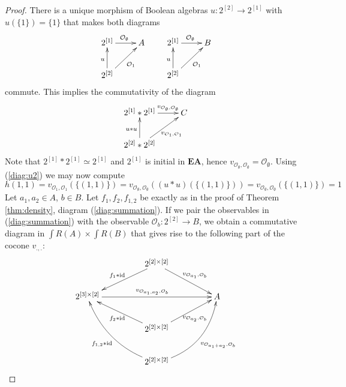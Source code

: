 \documentclass[smallextended]{svjour3}
\begin{document}
\begin{proof}
There is a unique morphism of Boolean algebras 
$u:2^{[2]}\to 2^{[1]}$ with $u(\{1\})=\{1\}$ that makes both diagrams
\begin{equation}
\label{diag:u}
\xymatrix{
2^{[1]}
	\ar[r]^{{\mathcal O_{{\emptyset}}}}
&
A
\\
2^{[2]}
	\ar[u]^u
	\ar[ur]_{{\mathcal O_{{1}}}}
}
\qquad
\xymatrix{
2^{[1]}
	\ar[r]^{{\mathcal O_{{\emptyset}}}}
&
B
\\
2^{[2]}
	\ar[u]^u
	\ar[ur]_{{\mathcal O_{{1}}}}
}
\end{equation}
commute.
This implies the commutativity of the diagram
\begin{equation}
\label{diag:u2}
\xymatrix{
2^{[1]}*2^{[1]}
	\ar[r]^-{v_{{\mathcal O_{{\emptyset}}},{\mathcal O_{{\emptyset}}}}}
&
C
\\
2^{[2]}*2^{[2]}
	\ar[u]^{u*u}
	\ar[ur]_{v_{{\mathcal O_{{1}}},{\mathcal O_{{1}}}}}
}
\end{equation}
Note that $2^{[1]}*2^{[1]}\simeq 2^{[1]}$ and $2^{[1]}$ is initial in ${\mathbf{EA}}$, 
hence $v_{{\mathcal O_{{\emptyset}}},{\mathcal O_{{\emptyset}}}}={\mathcal O_{{\emptyset}}}$. Using (\ref{diag:u2}) we may now
compute
$$
h(1,1)=v_{{\mathcal O_{{1}}},{\mathcal O_{{1}}}}(\{(1,1)\})=
v_{{\mathcal O_{{\emptyset}}},{\mathcal O_{{\emptyset}}}}((u*u)(\{(1,1)\}))=v_{{\mathcal O_{{\emptyset}}},{\mathcal O_{{\emptyset}}}}(\{(1,1)\})=1
$$
Let $a_1,a_2\in A$, $b\in B$.
Let $f_1,f_2,f_{1,2}$ be exactly as in the proof of Theorem \ref{thm:density}, diagram
(\ref{diag:summation}).
If we pair the observables in (\ref{diag:summation}) with the observable ${\mathcal O_{{b}}}:2^{[2]}\to B$,
we obtain a commutative diagram in ${\int R({A})}\times{\int R({B})}$ that gives rise to the
following
part of the cocone $v_{.,.}$:
\begin{equation}
\label{diag:summation2}
\xymatrix@C=4pc{
~
&
2^{[2]\times[2]}
	\ar[ld]_{f_1*{\mathrm{id}}}
	\ar[rd]^{v_{{\mathcal O_{{a_1}}},{\mathcal O_{{b}}}}}
\\
2^{[3]\times[2]}
	\ar[rr]^{v_{{\mathcal O_{{a_1,a_2}}},{\mathcal O_{{b}}}}}
&
~
&
A
\\
&
2^{[2]\times[2]}
	\ar[lu]^{f_2*{\mathrm{id}}}
	\ar[ru]_{v_{{\mathcal O_{{a_2}}},{\mathcal O_{{b}}}}}
\\
~
&
2^{[2]\times[2]}
	\ar@/^1.2pc/[luu]^{f_{1,2}*{\mathrm{id}}}
	\ar@/_1.5pc/[ruu]_{v_{{\mathcal O_{{a_1+a_2}}},{\mathcal O_{{b}}}}}
}
\end{equation}


\end{proof}
\end{document}
